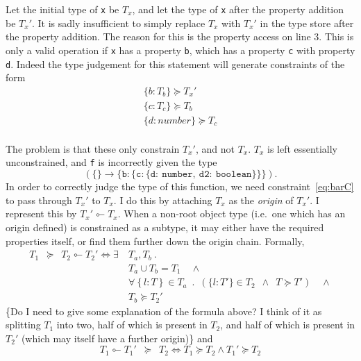 \documentclass[12pt,a4paper,twoside,openright]{report}
\newcommand*{\js}{\texttt}
\newcommand*{\orig}{\ensuremath{\!\multimapinv\!}}
\begin{document}
Let the initial type of \js{x} be $T_x$, and let the type of \js{x} after the
property addition be $T_x'$. It is sadly insufficient to simply replace $T_x$
with $T_x'$ in the type store after the property addition.  The reason for this
is the property access on line 3. This is only a valid operation if \js{x} has
a property \js{b}, which has a property \js{c} with property \js{d}. Indeed the
type judgement for this statement will generate constraints of the form 
\begin{equation}
 \begin{split}
 \label{eq:barC}
 \{b:T_b\} \succeq T_x' \\
 \{c:T_c\} \succeq T_b \\
 \{d:number\} \succeq T_c \\
\end{split}
\end{equation}

The problem is that these only constrain $T_x'$, and not $T_x$. $T_x$ is
left essentially unconstrained, and \js{f} is incorrectly given the type
$$\mathtt{(\mathtt{\{\} \rightarrow \{b:\{c:\{d:\ number,\ d2:\ boolean\}\}\}})}.$$ In order to
correctly judge the type of this function, we need constraint~\eqref{eq:barC}
to pass through $T_x'$ to $T_x$. I do this by attaching $T_x$ as the
\textit{origin} of $T_x'$. I represent this by $T_x'\orig T_x$. When a
non-root object type (i.e.~one which has an origin defined) is constrained as a
subtype, it may either have the required properties itself, or find them
further down the origin chain. Formally,
\begin{equation}
 \begin{split}
	T_1\enspace \succeq\enspace T_2\orig T_2' \iff \exists\ & T_a, T_b\ .\\
	& T_a\cup T_b = T_1 \quad\land \\
	& \forall \left\{l: T\right\} \in T_a \enspace.\enspace (\{l: T'\}\in T_2\enspace \land \enspace T \succeq T') \quad\land \\
	& T_b \succeq T_2'
 \end{split}
 \label{succeq}
\end{equation}
{\color{red}\{Do I need to give some explanation of the formula above? I think
  of it as splitting $T_1$ into two, half of which is present in $T_2$, and
  half of which is present in $T_2'$ (which may itself have a further
  origin)\}}
and
\begin{equation}
 T_1\orig T_1'\enspace \succeq \enspace T_2 \iff T_1\succeq T_2 \land T_1' \succeq T_2
\end{equation}
\end{document}
